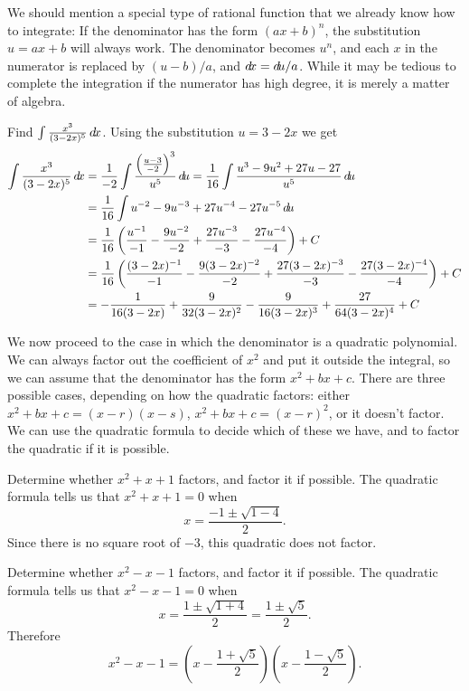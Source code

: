 \documentclass{ximera}
\begin{document}
We should mention a special type of rational function that we already
know how to integrate: If the denominator has the form $(ax+b)^n$,
the substitution $u=ax+b$ will always work.  The denominator becomes
$u^n$, and each $x$ in the numerator is replaced by $(u-b)/a$, and
$\mathop{}\!d\! x=\mathop{}\!d\! u/a$. While it may be tedious to complete the integration if the
numerator has high degree, it is merely a matter of algebra.

\begin{example}
Find $\int\frac{x^3}{(3-2x)^5}\mathop{}\!d\! x$. Using the substitution 
$u=3-2x$ we get
\begin{align*}
  \int\frac{x^3}{(3-2x)^5}\d x
  &=\frac{1}{-2}\int \frac{\left(\frac{u-3}{-2}\right)^3}{u^5}\d u
  =\frac{1}{16}\int \frac{u^3-9u^2+27u-27}{u^5}\d u \\
  &=\frac{1}{16}\int u^{-2}-9u^{-3}+27u^{-4}-27u^{-5}\d u \\
  &=\frac{1}{16}\left(\frac{u^{-1}}{-1}-\frac{9u^{-2}}{-2}+\frac{27u^{-3}}{-3}
  -\frac{27u^{-4}}{-4}\right)+C \\
  &=\frac{1}{16}\left(\frac{(3-2x)^{-1}}{-1}-\frac{9(3-2x)^{-2}}{-2}+
  \frac{27(3-2x)^{-3}}{-3}
  -\frac{27(3-2x)^{-4}}{-4}\right)+C \\
  &=-\frac{1}{16(3-2x)}+\frac{9}{32(3-2x)^2}-\frac{9}{16(3-2x)^3}+\frac{27}{64(3-2x)^4}+C
\end{align*}
\end{example}

We now proceed to the case in which the denominator is a quadratic
polynomial.  We can always factor out the coefficient of $x^2$ and put
it outside the integral, so we can assume that the denominator has the
form $x^2+bx+c$.  There are three possible cases, depending on how
the quadratic factors: either $x^2+bx+c=(x-r)(x-s)$,
$x^2+bx+c=(x-r)^2$, or it doesn't factor. We can use the quadratic
formula to decide which of these we have, and to factor the quadratic
if it is possible.

\begin{example}
Determine whether $x^2+x+1$ factors, and factor it if possible.
The quadratic formula tells us that $x^2+x+1=0$ when
\[
x=\frac{-1\pm\sqrt{1-4}}{2}.
\]
Since there is no square root of $-3$, this quadratic does not factor.
\end{example}

\begin{example}
Determine whether $x^2-x-1$ factors, and factor it if possible.
The quadratic formula tells us that $x^2-x-1=0$ when
\[
x=\frac{1\pm\sqrt{1+4}}{2}=\frac{1\pm\sqrt{5}}{2}.
\]
Therefore
\[
  x^2-x-1=\left(x-\frac{1+\sqrt{5}}{2}\right)\left(x-\frac{1-\sqrt{5}}{2}\right).
\]
\end{example}
\end{document}
